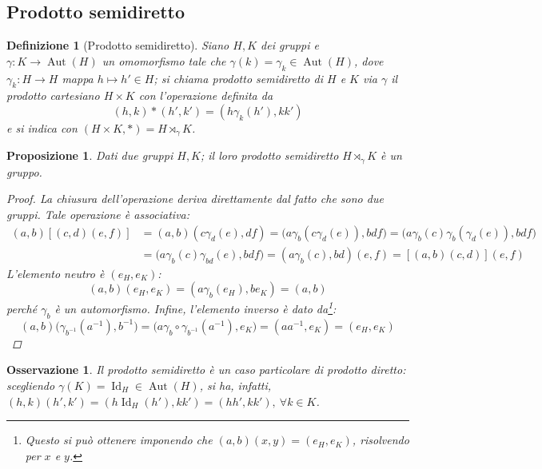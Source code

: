 \documentclass[11pt]{scrartcl}
\theoremstyle{style1}
\newtheorem{osservazione}{Osservazione}[section]
\newtheorem{prop}{Proposizione}[section]
\newtheorem{definizione}{Definizione}[section]
\numberwithin{equation}{subsection}
\begin{document}
\subsection{Prodotto semidiretto}
\begin{definizione}
	[Prodotto semidiretto]
	Siano $H ,K$ dei gruppi e $\gamma : K \to \operatorname{Aut} (H)$ un omomorfismo tale che $\gamma(k)=\gamma_k \in \operatorname{Aut} (H)$, dove $\gamma_k : H\to H$ mappa $h\mapsto h' \in H$; si chiama \textit{prodotto semidiretto} di $H$ e $K$ via $\gamma$ il prodotto cartesiano $H\times K$ con l'operazione definita da
	\[
		(h,k) * (h',k') = (h \gamma_k(h'), kk')
	\] 
	e si indica con $(H\times K, *) = H\rtimes _\gamma K$.
\end{definizione}
\begin{prop}
	Dati due gruppi $H,K$; il loro prodotto semidiretto $H \rtimes _\gamma K$ \`e un gruppo.
	\begin{proof}
		La chiusura dell'operazione deriva direttamente dal fatto che sono due gruppi.
		Tale operazione \`e associativa:
		\[
			\begin{split}
				(a,b)\left[ (c,d)(e,f) \right] &=(a,b)(c\gamma_d(e),df) = \big(a \gamma_b(c\gamma_d(e)),bdf\big)= \big(a\gamma_b(c) \gamma_b(\gamma_d(e)),bdf\big)\\
				&=\big(a \gamma_b(c) \gamma_{bd} (e),bdf\big) = (a\gamma_b(c), bd)(e,f) = \left[ (a,b)(c,d) \right] (e,f)
			\end{split}
		\] 
	L'elemento neutro \`e $(e_H,e_K)$:	
\[
	(a,b) (e_H,e_K) = (a \gamma_b(e_H) , be_K) = (a,b)
\] 
perch\'e $\gamma_b$ \`e un automorfismo.
Infine, l'elemento inverso \`e dato da\footnote{Questo si pu\`o ottenere imponendo che $(a,b)(x,y) = (e_H,e_K)$, risolvendo per $x$ e $y$.}:
\[
(a,b) \big(\gamma_{b^{-1}} (a^{-1}), b^{-1}\big) = \big(a \gamma_{b} \circ \gamma_{b^{-1}}(a^{-1}) , e_K \big)=(a a^{-1},e_K) = (e_H,e_K)
\] 
	\end{proof}
\end{prop}
\begin{osservazione}
Il prodotto semidiretto \`e un caso particolare di prodotto diretto: scegliendo $\gamma(K) = \operatorname{Id} _H \in \operatorname{Aut} (H)$, si ha, infatti, $(h,k)(h',k') = (h\operatorname{Id}_H(h'),kk') = (hh',k k'), \ \forall k \in K$.
\end{osservazione}
\end{document}
